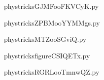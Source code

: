     

    \clearpage
    


    \newcommand{\CaptionFigGJMFooFKVCyK}{<+Type your caption here+>}
    \begin{center}
        
    \end{center}
    phystricksGJMFooFKVCyK.py

    

    \clearpage
    


    \newcommand{\CaptionFigZPBMooYYMMgs}{<+Type your caption here+>}
    \begin{center}
        
    \end{center}
    phystricksZPBMooYYMMgs.py

    

    \clearpage
    


    \newcommand{\CaptionFigMTZooSGviQ}{<+Type your caption here+>}
    \begin{center}
        
    \end{center}
    phystricksMTZooSGviQ.py

    

    \clearpage
    


    \newcommand{\CaptionFigfigureCSIQETx}{<+Type your caption here+>}
    \begin{center}
        
    \end{center}
    phystricksfigureCSIQETx.py

    

    \clearpage
    


    \newcommand{\CaptionFigRGRLooTmnwQZ}{<+Type your caption here+>}
    \begin{center}
        
    \end{center}
    phystricksRGRLooTmnwQZ.py

    

    \clearpage
    


